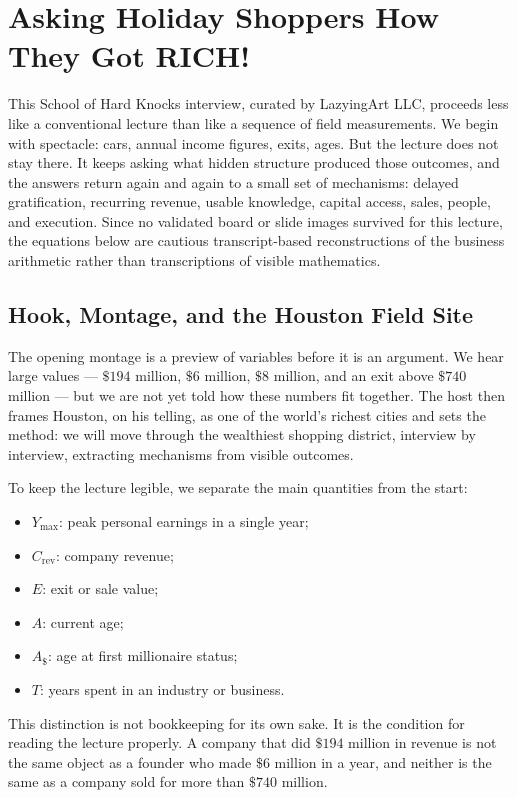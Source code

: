 \chapter{Asking Holiday Shoppers How They Got RICH!}

This School of Hard Knocks interview, curated by LazyingArt LLC, proceeds less like a conventional lecture than like a sequence of field measurements. We begin with spectacle: cars, annual income figures, exits, ages. But the lecture does not stay there. It keeps asking what hidden structure produced those outcomes, and the answers return again and again to a small set of mechanisms: delayed gratification, recurring revenue, usable knowledge, capital access, sales, people, and execution. Since no validated board or slide images survived for this lecture, the equations below are cautious transcript-based reconstructions of the business arithmetic rather than transcriptions of visible mathematics.

\section{Hook, Montage, and the Houston Field Site}

The opening montage is a preview of variables before it is an argument. We hear large values --- \(\$194\) million, \(\$6\) million, \(\$8\) million, and an exit above \(\$740\) million --- but we are not yet told how these numbers fit together. The host then frames Houston, on his telling, as one of the world's richest cities and sets the method: we will move through the wealthiest shopping district, interview by interview, extracting mechanisms from visible outcomes.

To keep the lecture legible, we separate the main quantities from the start:
\begin{itemize}
\item \(Y_{\max}\): peak personal earnings in a single year;
\item \(C_{\text{rev}}\): company revenue;
\item \(E\): exit or sale value;
\item \(A\): current age;
\item \(A_{\$}\): age at first millionaire status;
\item \(T\): years spent in an industry or business.
\end{itemize}

This distinction is not bookkeeping for its own sake. It is the condition for reading the lecture properly. A company that did \(\$194\) million in revenue is not the same object as a founder who made \(\$6\) million in a year, and neither is the same as a company sold for more than \(\$740\) million.

